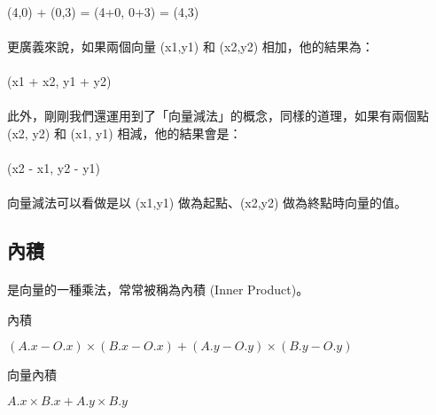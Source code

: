 \documentclass[12pt,a4paper,oneside]{report}
\begin{document}
\begin{CJK}{UTF8}{bkai}
\paragraph{}(4,0) + (0,3) = (4+0, 0+3) = (4,3)
\paragraph{}更廣義來說，如果兩個向量 (x1,y1) 和 (x2,y2) 相加，他的結果為：
\paragraph{}(x1 + x2, y1 + y2)
\paragraph{}此外，剛剛我們還運用到了「向量減法」的概念，同樣的道理，如果有兩個點 (x2, y2) 和 (x1, y1) 相減，他的結果會是：
\paragraph{}(x2 - x1, y2 - y1)
\paragraph{}向量減法可以看做是以 (x1,y1) 做為起點、(x2,y2) 做為終點時向量的值。

\subsection{內積}

\paragraph{}是向量的一種乘法，常常被稱為內積 (Inner Product)。
\begin{algorithm}
\caption{內積}
\label{algo:dot_product}
\begin{algorithmic}
  \State \Return $(A.x-O.x)\times{(B.x-O.x)}+(A.y-O.y)\times{(B.y-O.y)}$
\EndProcedure
\end{algorithmic}
\end{algorithm}

\begin{algorithm}
\caption{向量內積}
\label{algo:dot_product_vector}
\begin{algorithmic}
  \State \Return $A.x\times{B.x}+A.y\times{B.y}$
\EndProcedure
\end{algorithmic}
\end{algorithm}


\end{CJK}
\end{document}
